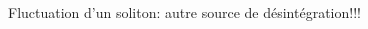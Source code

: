 \documentclass[handout]{beamer}
\begin{document}
\begin{frame}
\begin{columns}[T]
\begin{column}[T]{.45\linewidth}
\begin{enumerate}
    \end{enumerate}
    \end{column}
\end{columns}
%

Fluctuation d'un soliton: autre source de désintégration!!!\\
\end{frame}




\end{document}
